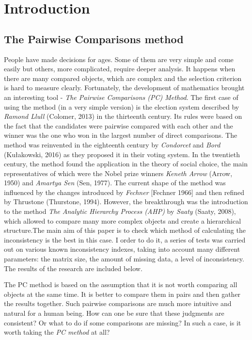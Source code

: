 \chapter{Introduction}
\label{cha:wprowadzenie}

\section{The Pairwise Comparisons method}
\label{sec:metodaPorowan}
People have made decisions for ages. Some of them are very simple and come easily but others, more complicated, require deeper analysis. It happens when there are many compared objects, which are complex and the selection criterion is hard to measure clearly. Fortunately, the development of mathematics brought an interesting tool - \textit{The Pairwise Comparisons (PC) Method}. The first case of using the method (in a very simple version) is the election system described by \textit{Ramond Llull} (Colomer, 2013) in the thirteenth century. Its rules were based on the fact that the candidates were pairwise compared with each other and the winner was the one who won in the largest number of direct comparisons. The method was reinvented in the eighteenth century by \textit{Condorcet} and \textit{Bord} (Kułakowski, 2016) as they proposed it in their voting system. In the twentieth century, the method found the application in the theory of social choice, the main representatives of which were the Nobel prize winners \textit{Keneth Arrow} (Arrow, 1950) and \textit{Amartya Sen} (Sen, 1977). The current shape of the method was influenced by the changes introduced by \textit{Fechner} [Fechner 1966] and then refined by {Thrustone} (Thurstone, 1994). However, the breakthrough was the introduction to the method \textit\textit{The Analytic Hierarchy Process (AHP)} by \textit{Saaty} (Saaty, 2008), which allowed to compare many more complex objects and create a hierarchical structure.The main aim of this paper is to check which method of calculating the inconsistency is the best in this case. I order to do it, a series of tests was carried out on various known inconsistency indexes, taking into account many different parameters: the matrix size, the amount of missing data, a level of inconsistency. The results of the research are included below.

The PC method is based on the assumption that it is not worth comparing all objects at the same time. It is better to compare them in pairs and then gather the results together. Such pairwise comparisons are much more intuitive and natural for a human being. How can one be sure that these judgments are consistent? Or what to do if some comparisons are missing? In such a case, is it worth taking the \textit{PC method} at all?


